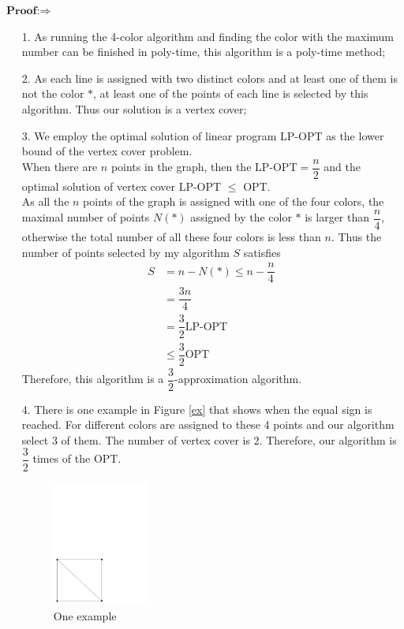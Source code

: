 \documentclass[a4paper,12pt]{article}
\begin{document}
$\textbf{Proof:} \Rightarrow $  
\begin{enumerate}
\item[1. ] As running the 4-color algorithm and finding the color with the maximum number  can be finished in  poly-time, this algorithm is a poly-time method;\\
\item[2. ] As each line is assigned with two distinct colors and at least one of them is not the color $*$,  at least one of the points of each line is selected by this algorithm. Thus our solution is a vertex cover;
\item[3. ] We employ the optimal solution of linear program  LP-OPT as the lower bound of the vertex cover problem. \\

When there are $n$ points in the graph, then the LP-OPT$=\dfrac{n}{2}$ and the optimal solution of vertex cover LP-OPT $\leq$ OPT.\\

As all the $n$ points of the graph is assigned with one of the four colors, the maximal number of points $N(*)$ assigned by the color $*$ is larger than $\dfrac{n}{4}$, otherwise the total number of all these four colors is less than $n$. Thus the number of points selected by my algorithm $S$ satisfies
\begin{align}
S &=n-N(*)\leq n-\dfrac{n}{4}
\\& =\dfrac{3n}{4}
\\ & =\dfrac{3}{2} \text{LP-OPT}
\\ & \leq \dfrac{3}{2} \text{OPT}
\end{align} 
Therefore, this algorithm is a $\dfrac{3}{2}$-approximation algorithm.  

\item[4. ] There is one example in Figure \ref{ex} that shows when the equal sign is reached. For different colors are assigned to these 4 points and our algorithm select 3 of them. The number of vertex cover is 2. Therefore, our algorithm is $\dfrac{3}{2}$ times of the OPT.

\begin{figure}[!h]
\centering
\includegraphics[width=0.3\textwidth]{./example}
\caption{One example}\label{ex}
\label{fig:example}
\end{figure}
\end{enumerate}
\end{document}
